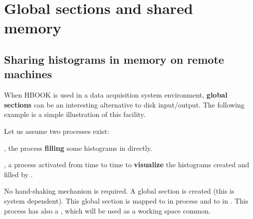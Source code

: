  
\chapter{Global sections and shared memory}
\label{HGLOSHAM}

\section{Sharing histograms in memory on remote machines}

 
When HBOOK is used in a data acquisition system environment,
{\bf global sections} can be an interesting alternative to disk input/output.
The following example is a simple illustration of this facility.
 
Let us assume two processes exist:
\begin{OL}
\item {}, the process {\bf filling} some histograms in
 directly.
\item {}, a process activated from time to time to
{\bf visualize} the histograms created and filled by .
\end{OL}
 
No hand-shaking mechanism is required. A global section is created
(this is system dependent).
%
This global section is mapped to  in process
 and to  in .
%
%
This process has also a ,
which will be used as a working space common.
 
